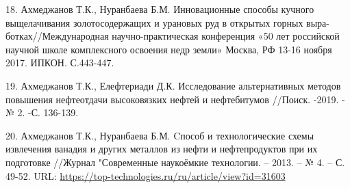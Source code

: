 \begin{references}
18. Ахмеджанов Т.К., Нуранбаева Б.М. Инновационные способы кучного
выщелачивания золотосодержащих и урановых руд в открытых горных
выра-ботках//Международная научно-практическая конференция «50 лет
российской научной школе комплексного освоения недр земли» Москва, РФ
13-16 ноября 2017. ИПКОН. С.443-447.

19. Ахмеджанов Т.К., Елефтериади Д.К. Исследование альтернативных
методов повышения нефтеотдачи высоковязких нефтей и нефтебитумов
//Поиск. -2019. -№ 2. -С. 136-139.

20. Ахмеджанов Т.К., Нуранбаева Б.М. Cпособ и технологические схемы
извлечения ванадия и других металлов из нефти и нефтепродуктов при их
подготовке //Журнал "Современные наукоёмкие технологии. -- 2013. -- № 4.
-- С. 49-52. URL:
\url{https://top-technologies.ru/ru/article/view?id=31603}
\end{references}

